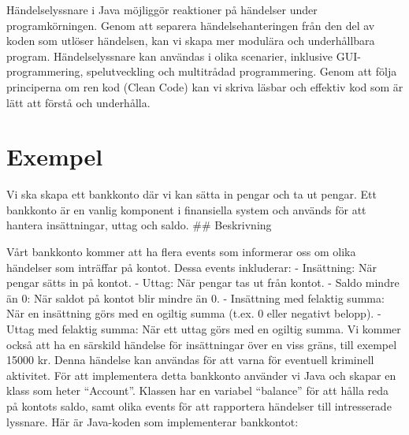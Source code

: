 Händelselyssnare i Java möjliggör reaktioner på händelser under
programkörningen. Genom att separera händelsehanteringen från den del av
koden som utlöser händelsen, kan vi skapa mer modulära och underhållbara
program. Händelselyssnare kan användas i olika scenarier, inklusive
GUI-programmering, spelutveckling och multitrådad programmering. Genom
att följa principerna om ren kod (Clean Code) kan vi skriva läsbar och
effektiv kod som är lätt att förstå och underhålla.

\hypertarget{exempel}{%
\section{Exempel}\label{exempel}}

Vi ska skapa ett bankkonto där vi kan sätta in pengar och ta ut pengar.
Ett bankkonto är en vanlig komponent i finansiella system och används
för att hantera insättningar, uttag och saldo. \#\# Beskrivning

Vårt bankkonto kommer att ha flera events som informerar oss om olika
händelser som inträffar på kontot. Dessa events inkluderar: -
Insättning: När pengar sätts in på kontot. - Uttag: När pengar tas ut
från kontot. - Saldo mindre än 0: När saldot på kontot blir mindre än 0.
- Insättning med felaktig summa: När en insättning görs med en ogiltig
summa (t.ex. 0 eller negativt belopp). - Uttag med felaktig summa: När
ett uttag görs med en ogiltig summa. Vi kommer också att ha en särskild
händelse för insättningar över en viss gräns, till exempel 15000 kr.
Denna händelse kan användas för att varna för eventuell kriminell
aktivitet. För att implementera detta bankkonto använder vi Java och
skapar en klass som heter ``Account''. Klassen har en variabel
``balance'' för att hålla reda på kontots saldo, samt olika events för
att rapportera händelser till intresserade lyssnare. Här är Java-koden
som implementerar bankkontot:

